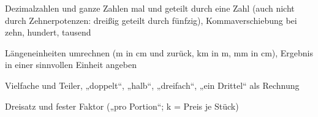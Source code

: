 \setcounter{aufgabe}{0}

\begin{aufgabe}{Dezimalzahlen und ganze Zahlen mal und geteilt durch eine Zahl (auch nicht durch Zehnerpotenzen: dreißig geteilt durch fünfzig), Kommaverschiebung bei zehn, hundert, tausend}
\end{aufgabe}

\begin{aufgabe}{Längeneinheiten umrechnen (m in cm und zurück, km in m, mm in cm), Ergebnis in einer sinnvollen Einheit angeben}
\end{aufgabe}

\begin{aufgabe}{Vielfache und Teiler, „doppelt“, „halb“, „dreifach“, „ein Drittel“ als Rechnung}
\end{aufgabe}

\begin{aufgabe}{Dreisatz und fester Faktor („pro Portion“; k = Preis je Stück)}
\end{aufgabe}

